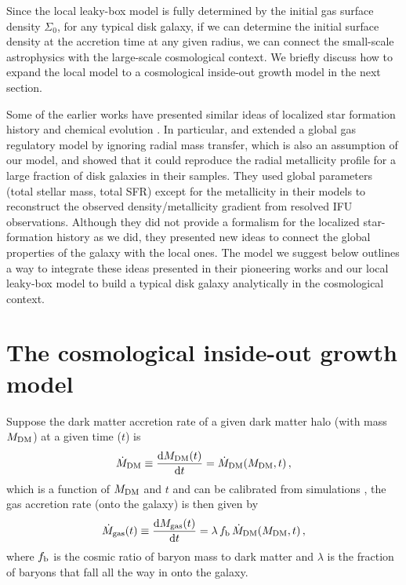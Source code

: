 \documentclass[12pt, appendixfloats, numberedappendix]{emulateapj}
\begin{document}
Since the local leaky-box model is fully determined by the initial gas surface density $\Sigma_0$, 
for any typical disk galaxy, if we can determine the initial surface density at the accretion time at any given radius, 
we can connect the small-scale astrophysics with the large-scale cosmological context. 
We briefly discuss how to expand the local model to a cosmological inside-out growth model in the next section. 

Some of the earlier works have presented similar ideas of localized star formation history and chemical evolution 
\citep[\eg][]{rosales12a, sanchez13a, fu13a, ho15a, carton15a, kudritzki15a}. 
In particular, \citet{ho15a} and \citet{carton15a} extended a global gas regulatory model \citep{lilly13a} by ignoring radial mass transfer,
which is also an assumption of our model, and showed that it could reproduce the radial metallicity profile for a large fraction of 
disk galaxies in their samples. They used global parameters (total stellar mass, total 
SFR) except for the metallicity in their models to reconstruct the observed density/metallicity gradient from resolved IFU 
observations. Although they did not provide a formalism for the localized star-formation history as we did,
they presented new ideas to connect the global properties of the galaxy with the local ones.
The model we suggest below outlines a way to integrate these ideas presented in their pioneering works
and our local leaky-box model to build a typical disk galaxy analytically in the cosmological context.


\section{The cosmological inside-out growth model}\label{sec:insideout}

Suppose the dark matter accretion rate of a given dark matter halo (with mass $M_{\rm DM}$) at a given time ($t$) is
\begin{equation}
\dot{M}_{\rm DM} \equiv \frac{{\rm d} M_{\rm DM}(t)}{{\rm d} t} = \dot{M}_{\rm DM} (M_{\rm DM}, t)\,\mathrm{,}
\end{equation}
\noindent which is a function of $M_{\rm DM}$ and $t$ and can be calibrated from simulations \citep[\eg][]{wechsler02a, correa15a}, 
the gas accretion rate (onto the galaxy) is then given by
\begin{equation}
\dot{M}_{\rm gas} (t) \equiv \frac{{\rm d} M_{\rm gas}(t)}{{\rm d} t} = \lambda\,f_{\rm b}\,\dot{M}_{\rm DM} (M_{\rm DM}, t)\,\mathrm{,}
\label{eq:cosmogasaccretion}
\end{equation}
\noindent where $f_{\rm b}$ is the cosmic ratio of baryon mass to dark matter and $\lambda$ is the fraction of baryons 
that fall all the way in onto the galaxy.
\end{document}
